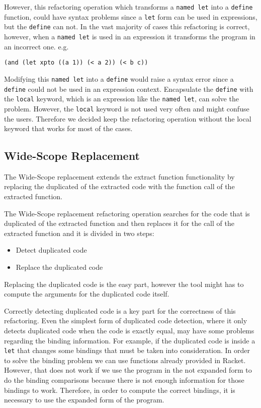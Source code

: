 However, this refactoring operation which transforms a {\tt named let} into a {\tt define} function,
 could have syntax problems since a {\tt let} form can be used in expressions, but the {\tt define} can not.
In the vast majority of cases this refactoring is correct, however, when a {\tt named let} is used in an expression
it transforms the program in an incorrect one.
e.g.
\begin{lstlisting}[basicstyle=\ttfamily, caption=Let in an expression]
(and (let xpto ((a 1)) (< a 2)) (< b c))
\end{lstlisting}
Modifying this {\tt named let} into a {\tt define} would raise a syntax error since a
{\tt define} could not be used in an expression context.
Encapsulate the {\tt define} with the {\tt local} keyword, which is an expression like
the {\tt named let}, can solve the problem.
However, the {\tt local} keyword is not used very often and might confuse the users.
Therefore we decided keep the refactoring operation without the local keyword that works for
most of the cases.


\subsection{Wide-Scope Replacement}
The Wide-Scope replacement extends the extract function functionality by replacing
the duplicated of the extracted code with the function call of the extracted function.


The Wide-Scope replacement refactoring operation searches for the code that is duplicated of the extracted
function and then replaces it for the call of the
extracted function and it is divided in two steps:
\begin{itemize}
\item Detect duplicated code
\item Replace the duplicated code
\end{itemize}

Replacing the duplicated code is the easy part, however the tool might has to compute
the arguments for the duplicated code itself.

Correctly detecting duplicated code is a key part for the correctness of this refactoring.
Even the simplest form of duplicated code detection, where it only detects duplicated code
when the code is exactly equal, may have some problems regarding the binding information.
For example, if the duplicated code is inside a {\tt let} that changes some bindings that must
be taken into consideration.
In order to solve the binding problem we can use functions already provided in Racket.
However, that does not work if we use the program in the not expanded
form to do the binding comparisons because there is not enough information for those bindings to work.
Therefore, in order to compute the correct bindings, it is necessary to use the expanded form
of the program.

